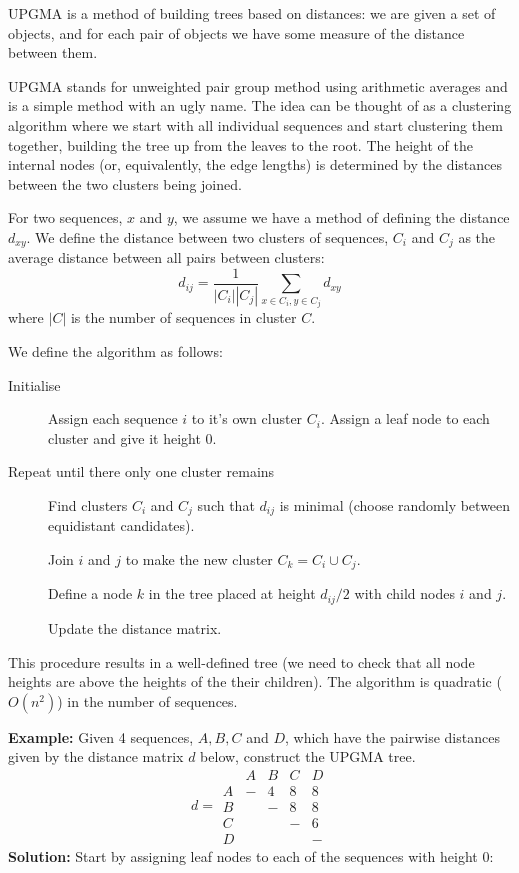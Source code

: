 \documentclass[11pt]{article}
\begin{document}

UPGMA is a method of building trees based on distances: we are given a set of objects, and for each pair of objects we have some measure of the distance between them.  

UPGMA stands for unweighted pair group method using arithmetic averages and is a simple method with an ugly name.  The idea can be thought of as a clustering algorithm where we start with all individual sequences  and start clustering them together, building the tree up from the leaves to the root.  The height of the internal nodes (or, equivalently, the edge lengths) is determined by the distances between the two clusters being joined.  

For two sequences, $x$ and $y$, we assume we have a method of defining the distance $d_{xy}$.  We define the distance between two clusters of sequences, $C_i$ and $C_j$ as the average distance between all pairs between clusters:
\[ d_{ij} = \frac1{|C_i| |C_j|}\sum_{x \in C_i,y \in C_j} d_{xy}\]
where $|C|$ is the number of sequences in cluster $C$.

We define the algorithm as follows:
\begin{description}
\item[Initialise]  Assign each sequence $i$ to it's own cluster $C_i$. Assign a leaf node to each cluster and give it height 0.
\item[Repeat until there only one cluster remains]  Find clusters $C_i$ and $C_j$ such that $d_{ij}$ is minimal (choose randomly between equidistant candidates). 

Join $i$ and $j$ to make the new cluster $C_k = C_i \cup C_j$.

Define a node $k$ in the tree placed at height $d_{ij}/2$ with child nodes $i$ and $j$.

Update the distance matrix.
\end{description}

This procedure results in a well-defined tree (we need to check that all node heights are above the heights of the their children).  The algorithm is quadratic ($O(n^2)$) in the number of sequences.


{\bf Example:} Given 4 sequences, $A,B,C$ and $D$, which have the pairwise distances given by the distance matrix $d$ below, construct the UPGMA tree.
\[ d= \begin{array}{ccccc}
& A& B&C&D \\
A &-&4 & 8 & 8 \\
B & & - & 8 & 8 \\
C & & & - & 6 \\
D &&&& -
\end{array}
\]
{\bf Solution:}  Start by assigning leaf nodes to each of the sequences with height 0:
\end{document}
